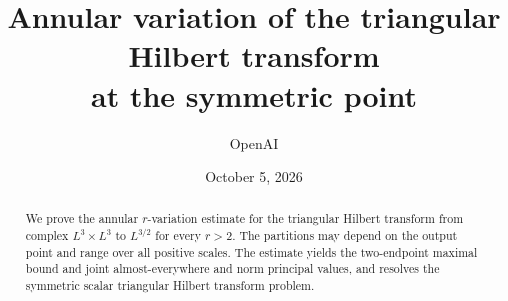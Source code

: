 \documentclass[11pt]{article}
\title{Annular variation of the triangular Hilbert transform\\at the symmetric point}
\author{OpenAI}
\date{October 5, 2026}
\theoremstyle{definition}
\theoremstyle{remark}
\numberwithin{equation}{section}
\begin{document}
\maketitle
\begin{abstract}
We prove the annular $r$-variation estimate for the triangular Hilbert
transform from complex $L^3\times L^3$ to $L^{3/2}$ for every $r>2$.
The partitions may depend on the output point and range over all positive
scales. The estimate yields the two-endpoint maximal bound and joint
almost-everywhere and norm principal values, and resolves the symmetric
scalar triangular Hilbert transform problem.
\end{abstract}
\tableofcontents











\end{document}
